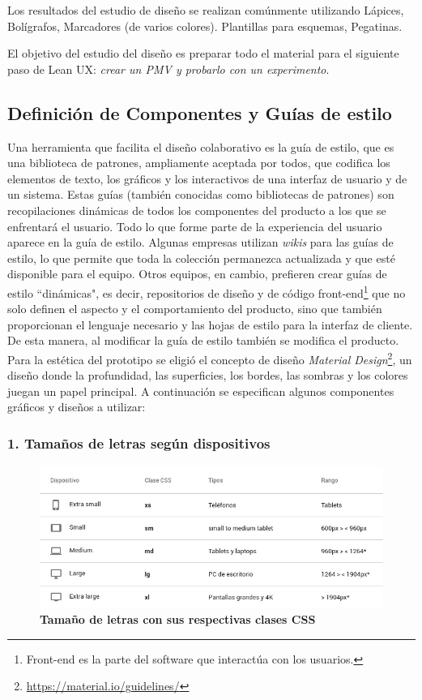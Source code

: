 Los resultados del estudio de diseño se realizan comúnmente utilizando Lápices, Bolígrafos, Marcadores (de varios colores). Plantillas para esquemas, Pegatinas.

El objetivo del estudio del diseño es preparar todo el material para el siguiente paso de Lean UX: \textit{crear un PMV y probarlo con un experimento}.


\clearpage
\subsection{Definición de Componentes y Guías de estilo}
Una herramienta que facilita el diseño colaborativo es la guía de estilo, que es una biblioteca de patrones, ampliamente aceptada por todos, que codifica los elementos de texto, los gráficos y los interactivos de una interfaz de usuario y de un sistema. Estas guías (también conocidas como bibliotecas de patrones) son recopilaciones dinámicas de todos los componentes del producto a los que se enfrentará el usuario. Todo lo que forme parte de la experiencia del usuario aparece en la guía de estilo. Algunas empresas utilizan \textit{wikis} para las guías de estilo, lo que permite que toda la colección permanezca actualizada y que esté disponible para el equipo. Otros equipos, en cambio, prefieren crear guías de estilo ``dinámicas", es decir, repositorios de diseño y de código front-end\footnote{Front-end es la parte del software que interactúa con los usuarios.} que no solo definen el aspecto y el comportamiento del producto, sino que también proporcionan el lenguaje necesario y las hojas de estilo para la interfaz de cliente. De esta manera, al modificar la guía de estilo también se modifica el producto.
Para la estética del prototipo se eligió el concepto de diseño \textit{Material Design}\footnote{\url{https://material.io/guidelines/}}, un diseño donde la profundidad, las superficies, los bordes, las sombras y los colores juegan un papel principal. A continuación se especifican algunos componentes gráficos y diseños a utilizar:


\subsubsection{1. Tamaños de letras según dispositivos}
    \begin{figure}[h]
    \includegraphics[width=14cm]{Img/UX/guia1.jpg}
    \centering
    \caption{\textbf{ \footnotesize{Tamaño de letras con sus respectivas clases CSS}}}
\end{figure} 
    
